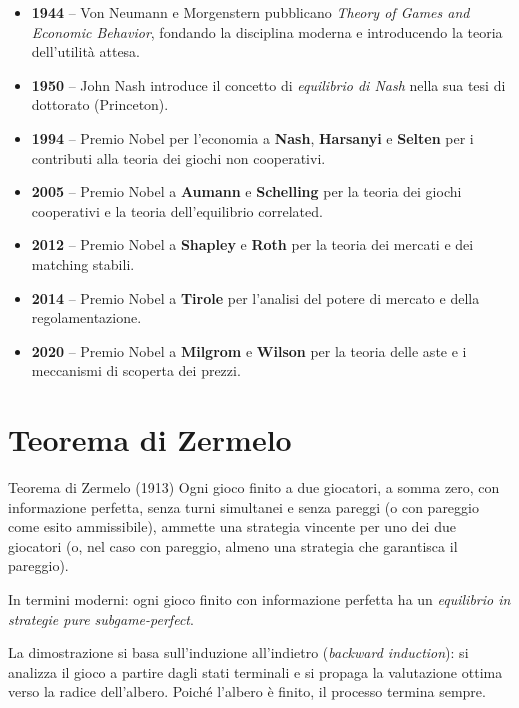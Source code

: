 \documentclass[12pt,a4paper,twoside]{book}
\theoremstyle{plain}
\theoremstyle{definition}
\begin{document}
\begin{itemize}[leftmargin=2em]
  \item \textbf{1944} -- Von Neumann e Morgenstern pubblicano \emph{Theory of Games and Economic Behavior}, fondando la disciplina moderna e introducendo la teoria dell'utilità attesa.
  \item \textbf{1950} -- John Nash introduce il concetto di \emph{equilibrio di Nash} nella sua tesi di dottorato (Princeton).
  \item \textbf{1994} -- Premio Nobel per l'economia a \textbf{Nash}, \textbf{Harsanyi} e \textbf{Selten} per i contributi alla teoria dei giochi non cooperativi.
  \item \textbf{2005} -- Premio Nobel a \textbf{Aumann} e \textbf{Schelling} per la teoria dei giochi cooperativi e la teoria dell'equilibrio correlated.
  \item \textbf{2012} -- Premio Nobel a \textbf{Shapley} e \textbf{Roth} per la teoria dei mercati e dei matching stabili.
  \item \textbf{2014} -- Premio Nobel a \textbf{Tirole} per l'analisi del potere di mercato e della regolamentazione.
  \item \textbf{2020} -- Premio Nobel a \textbf{Milgrom} e \textbf{Wilson} per la teoria delle aste e i meccanismi di scoperta dei prezzi.
\end{itemize}

\section{Teorema di Zermelo}

\begin{thmbox}{Teorema di Zermelo (1913)}
Ogni gioco finito a due giocatori, a somma zero, con informazione perfetta, senza turni simultanei e senza pareggi (o con pareggio come esito ammissibile), ammette una strategia vincente per uno dei due giocatori (o, nel caso con pareggio, almeno una strategia che garantisca il pareggio).

In termini moderni: ogni gioco finito con informazione perfetta ha un \emph{equilibrio in strategie pure subgame-perfect}.
\end{thmbox}

La dimostrazione si basa sull'induzione all'indietro (\emph{backward induction}): si analizza il gioco a partire dagli stati terminali e si propaga la valutazione ottima verso la radice dell'albero. Poiché l'albero è finito, il processo termina sempre.
\end{document}
